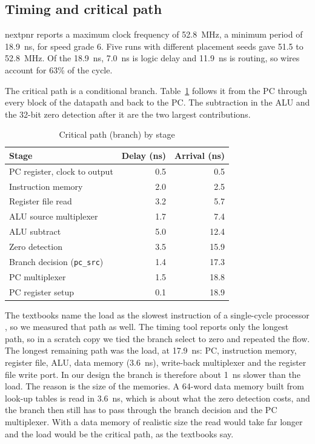 \documentclass[conference]{IEEEtran}
\begin{document}
\subsection{Timing and critical path}
nextpnr reports a maximum clock frequency of 52.8~MHz, a minimum period of
18.9~ns, for speed grade 6. Five runs with different placement seeds gave
51.5 to 52.8~MHz. Of the 18.9~ns, 7.0~ns is logic delay and 11.9~ns is
routing, so wires account for 63\% of the cycle.

The critical path is a conditional branch. Table~\ref{tab:path} follows it
from the PC through every block of the datapath and back to the PC. The
subtraction in the ALU and the 32-bit zero detection after it are the two
largest contributions.

\begin{table}[!htb]
\caption{Critical path (branch) by stage}
\label{tab:path}
\centering
\begin{tabular}{@{}lrr@{}}
\toprule
Stage & Delay (ns) & Arrival (ns) \\
\midrule
PC register, clock to output      & 0.5 & 0.5 \\
Instruction memory                & 2.0 & 2.5 \\
Register file read                & 3.2 & 5.7 \\
ALU source multiplexer            & 1.7 & 7.4 \\
ALU subtract                      & 5.0 & 12.4 \\
Zero detection                    & 3.5 & 15.9 \\
Branch decision (\texttt{pc\_src}) & 1.4 & 17.3 \\
PC multiplexer                    & 1.5 & 18.8 \\
PC register setup                 & 0.1 & 18.9 \\
\bottomrule
\end{tabular}
\end{table}

The textbooks name the load as the slowest instruction of a single-cycle
processor \cite{patterson2020, harris2021}, so we measured that path as well.
The timing tool reports only the longest path, so in a scratch copy we tied
the branch select to zero and repeated the flow. The longest remaining path
was the load, at 17.9~ns: PC, instruction memory, register file, ALU, data
memory (3.6~ns), write-back multiplexer and the register file write port. In
our design the branch is therefore about 1~ns slower than the load. The
reason is the size of the memories. A 64-word data memory built from
look-up tables is read in 3.6~ns, which is about what the zero detection
costs, and the branch then still has to pass through the branch decision and
the PC multiplexer. With a data memory of realistic size the read would take
far longer and the load would be the critical path, as the textbooks say.
\end{document}
